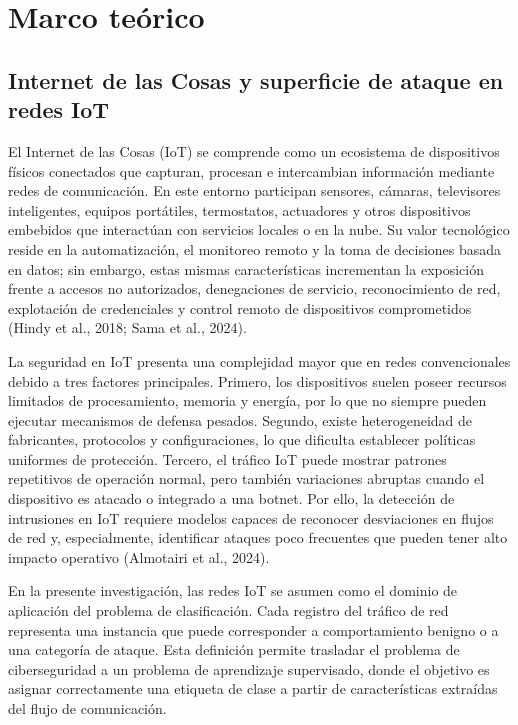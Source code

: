 \documentclass[12pt,a4paper]{article}
\begin{document}
\section{Marco teórico}

\subsection{Internet de las Cosas y superficie de ataque en redes IoT}

El Internet de las Cosas (IoT) se comprende como un ecosistema de dispositivos físicos conectados que capturan, procesan e intercambian información mediante redes de comunicación. En este entorno participan sensores, cámaras, televisores inteligentes, equipos portátiles, termostatos, actuadores y otros dispositivos embebidos que interactúan con servicios locales o en la nube. Su valor tecnológico reside en la automatización, el monitoreo remoto y la toma de decisiones basada en datos; sin embargo, estas mismas características incrementan la exposición frente a accesos no autorizados, denegaciones de servicio, reconocimiento de red, explotación de credenciales y control remoto de dispositivos comprometidos (Hindy et al., 2018; Sama et al., 2024).

La seguridad en IoT presenta una complejidad mayor que en redes convencionales debido a tres factores principales. Primero, los dispositivos suelen poseer recursos limitados de procesamiento, memoria y energía, por lo que no siempre pueden ejecutar mecanismos de defensa pesados. Segundo, existe heterogeneidad de fabricantes, protocolos y configuraciones, lo que dificulta establecer políticas uniformes de protección. Tercero, el tráfico IoT puede mostrar patrones repetitivos de operación normal, pero también variaciones abruptas cuando el dispositivo es atacado o integrado a una botnet. Por ello, la detección de intrusiones en IoT requiere modelos capaces de reconocer desviaciones en flujos de red y, especialmente, identificar ataques poco frecuentes que pueden tener alto impacto operativo (Almotairi et al., 2024).

En la presente investigación, las redes IoT se asumen como el dominio de aplicación del problema de clasificación. Cada registro del tráfico de red representa una instancia que puede corresponder a comportamiento benigno o a una categoría de ataque. Esta definición permite trasladar el problema de ciberseguridad a un problema de aprendizaje supervisado, donde el objetivo es asignar correctamente una etiqueta de clase a partir de características extraídas del flujo de comunicación.
\end{document}
